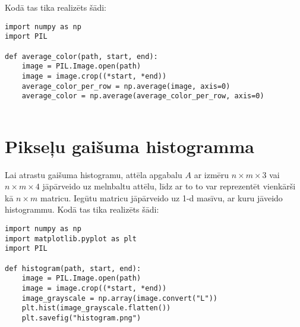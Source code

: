 \documentclass{article}
\begin{document}
Kodā tas tika realizēts šādi:
\begin{lstlisting}
import numpy as np
import PIL

def average_color(path, start, end):
    image = PIL.Image.open(path)
    image = image.crop((*start, *end))
    average_color_per_row = np.average(image, axis=0)
    average_color = np.average(average_color_per_row, axis=0)
    
\end{lstlisting}
\section{Pikseļu gaišuma histogramma}
Lai atrastu gaišuma histogramu, attēla apgabalu $A$ ar izmēru $n\times m\times 3$ vai $n\times m \times 4$ jāpārveido uz melnbaltu attēlu, līdz ar to to var reprezentēt vienkārši kā $n\times m$ matricu. Iegūtu matricu jāpārveido uz 1-d masīvu, ar kuru jāveido histogrammu. Kodā tas tika realizēts šādi:
\begin{lstlisting}
import numpy as np
import matplotlib.pyplot as plt
import PIL

def histogram(path, start, end):
    image = PIL.Image.open(path)
    image = image.crop((*start, *end))
    image_grayscale = np.array(image.convert("L"))
    plt.hist(image_grayscale.flatten())
    plt.savefig("histogram.png")
    
\end{lstlisting}
\end{document}
